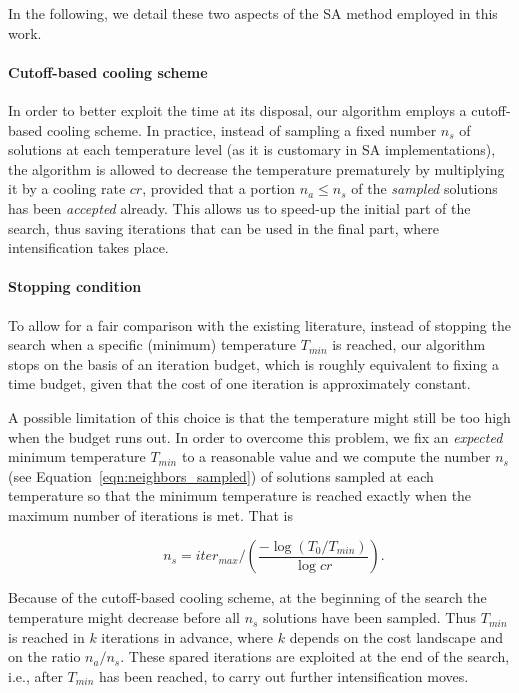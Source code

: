 \documentclass[authoryear,12pt]{article}
\begin{document}
In the following, we detail these two aspects of the SA method employed in this
work.

\paragraph{Cutoff-based cooling scheme}
In order to better exploit the time at its disposal, our algorithm employs a
cutoff-based cooling scheme. In practice, instead of sampling a fixed number
$n_s$ of solutions at each temperature level (as it is customary in SA
implementations), the algorithm is allowed to decrease the temperature
prematurely by multiplying it by a cooling rate $cr$, provided that a portion
$n_a \leq n_s$ of the \emph{sampled} solutions has been \emph{accepted} already.
This allows us to speed-up the initial part of the search, thus saving
iterations that can be used in the final part, where intensification takes
place.

\paragraph{Stopping condition}

To allow for a fair comparison with the existing literature, instead of
stopping the search when a specific (minimum) temperature $T_{min}$ is reached,
our algorithm stops on the basis of an iteration budget, which is roughly
equivalent to fixing a time budget, given that the cost of one iteration is
approximately constant.

A possible limitation of this choice is that the temperature might still be too
high when the budget runs out. In order to overcome this problem, we fix an
\emph{expected} minimum temperature $T_{min}$ to a reasonable value and we
compute the number $n_s$ (see Equation~\ref{eqn:neighbors_sampled}) of solutions
sampled at each temperature so that the minimum temperature is reached exactly
when the maximum number of iterations is met. That is

\begin{equation}
    \label{eqn:neighbors_sampled}
    \qquad n_s = iter_{max} \Bigg/ \left(\frac{-\log\left(T_{0}/T_{min}\right)}{\log cr}\right) .
\end{equation}

Because of the cutoff-based cooling scheme, at the beginning of the search the
temperature might decrease before all $n_s$ solutions have been sampled. Thus
$T_{min}$ is reached in $k$ iterations in advance, where $k$ depends on the cost
landscape and on the ratio $n_a/n_s$. These spared iterations are exploited at
the end of the search, i.e., after $T_{min}$ has been reached, to carry out
further intensification moves.
\end{document}
